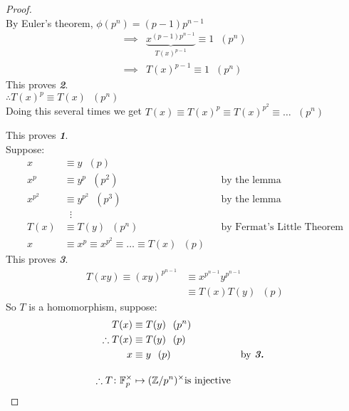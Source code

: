 \documentclass[11pt]{article}
\begin{document}
\begin{proof}$ $\\[1em]
	By Euler's theorem,  $\phi(p^n) = (p-1) p^{n-1} $ 
	\begin{align*}
		\implies& \underbrace{x^{(p-1)p^{n-1} } }_\text{$T(x)^{p-1}$}  \equiv 1 \hspace{7pt} (p^n)\\
		\implies & T(x)^{p-1} \equiv 1 \hspace{7pt} (p^n)
	\end{align*}
	This proves \textbf{\textit{2}}.\\[1em]
	$\therefore T(x)^p \equiv T(x) \hspace{7pt} (p^n)$\\
	Doing this several times we get $T(x) \equiv T(x)^p \equiv T(x)^{p^2} \equiv \dots \hspace{7pt} (p^n) $

	This proves \textbf{\textit{1}}.\\[1em]

	Suppose:
	\begin{align*}
		x &\equiv y \hspace{7pt} (p)\\
		x^p &\equiv y^p \hspace{7pt} (p^2) &&\text{by the lemma}  \\
		x^{p^2} &\equiv y^{p^2} \hspace{7pt} (p^3) && \text{by the lemma}\\
		& \hspace{7pt}\vdots\\
		T(x) &\equiv T(y) \hspace{7pt} (p^n) &&\text{by Fermat's Little Theorem}\\
		x&\equiv x^p \equiv x^{p^2} \equiv \dots \equiv T(x) \hspace{7pt} (p)
	\end{align*}
	This proves \textbf{\textit{3}}.\\
	\begin{align*}
		T(xy) \equiv (xy)^{p^{n-1}} &\equiv x^{p^{n-1}} y^{p^{n-1}}\\
		&\equiv T(x) T(y) \hspace{7pt} (p)
	\end{align*}
	So $T$ is a homomorphism, suppose:
	\begin{align*}
		T(x) &\equiv T(y) \hspace{7pt} (p^n)\\
		\therefore T(x) &\equiv T(y) \hspace{7pt} (p) \\
		x &\equiv y\hspace{7pt} (p) &&	\text{by \textbf{\textit{3.}}}\\[1em]
		\therefore T\colon \mathbb{F}_p^\times &\mapsto (\mathbb{Z}/p^n)^\times \text{is injective}
	\end{align*}
\end{proof}
\end{document}
